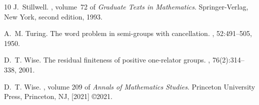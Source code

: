 \documentclass{amsart}
\theoremstyle{plain}
\theoremstyle{definition}
\begin{document}
\begin{thebibliography}{10}
J.~Stillwell.
, volume~72 of
  {\em Graduate Texts in Mathematics}.
\newblock Springer-Verlag, New York, second edition, 1993.

A.~M. Turing.
\newblock The word problem in semi-groups with cancellation.
, 52:491--505, 1950.

D.~T. Wise.
\newblock The residual finiteness of positive one-relator groups.
, 76(2):314--338, 2001.

D.~T. Wise.
, volume
  209 of {\em Annals of Mathematics Studies}.
\newblock Princeton University Press, Princeton, NJ, [2021] \copyright 2021.

\end{thebibliography}
\end{document}

